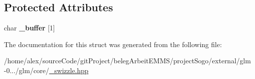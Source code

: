 \subsection*{Protected Attributes}
\begin{DoxyCompactItemize}
\item 
\hypertarget{structglm_1_1detail_1_1__swizzle__base0_afd4b7f15c9acff4cdef808f559ffec2d}{char {\bfseries \-\_\-buffer} \mbox{[}1\mbox{]}}\label{structglm_1_1detail_1_1__swizzle__base0_afd4b7f15c9acff4cdef808f559ffec2d}

\end{DoxyCompactItemize}


The documentation for this struct was generated from the following file\-:\begin{DoxyCompactItemize}
\item 
/home/alex/source\-Code/git\-Project/beleg\-Arbeit\-E\-M\-M\-S/project\-Sogo/external/glm-\/0.../glm/core/\hyperlink{__swizzle_8hpp}{\-\_\-swizzle.\-hpp}\end{DoxyCompactItemize}
